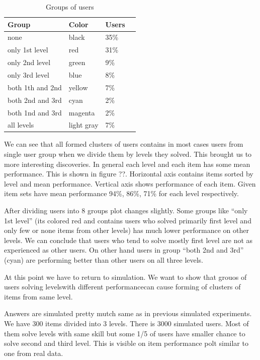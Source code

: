 \documentclass[
  digital, %
  table,   %
  nolof,     %
  nolot,     %
  nocover
]{fithesis3}
\begin{document}
\begin{table}
  \begin{tabular}{ | l | l | l | l | }
  \hline
  	Group & Color & Users \\ \hline
  	none & black & 35\% \\ \hline
  	only 1st level & red & 31\% \\ \hline
  	only 2nd level & green & 9\% \\ \hline
  	only 3rd level & blue  & 8\% \\ \hline
  	both 1th and 2nd & yellow & 7\% \\ \hline
  	both 2nd and 3rd & cyan & 2\% \\ \hline
  	both 1nd and 3rd & magenta & 2\% \\ \hline
  	all levels & light gray & 7\% \\ \hline
  \end{tabular}
  \caption{Groups of users}
  \label{tab:groups}
\end{table}


We can see that all formed clusters of users contains in most cases users
from single user group when we divide them by levels they solved. This
brought us to more interesting discoveries. In general each level and
each item has some mean performance. This is shown in figure ??.
Horizontal axis contains items sorted by level and mean performance.
Vertical axis shows performance of each item. Given item sets have mean
performance 94\%, 86\%, 71\% for each level respectively.

After dividing users into 8 groups plot changes slightly. Some groups
like ``only 1st level'' (its colored red and contains users who solved
primarily first level and only few or none items from other levels) has
much lower performance on other levels. We can conclude that users who
tend to solve mostly first level are not as experienced as other users. On
other hand users in group ``both 2nd and 3rd'' (cyan) are performing
better than other users on all three levels.

At this point we have to return to simulation. We want to show that
grouos of users solving levelswith different performancecan cause
forming of clusters of items from same level.

Answers are simulated pretty mutch same as in previous simulated
experiments. We have 300 items divided into 3 levels. There is 3000
simulated users. Most of them solve levels with same skill but some 1/5
of users have smaller chance to solve second and third level. This is
visible on item performance polt similar to one from real data.
\end{document}
